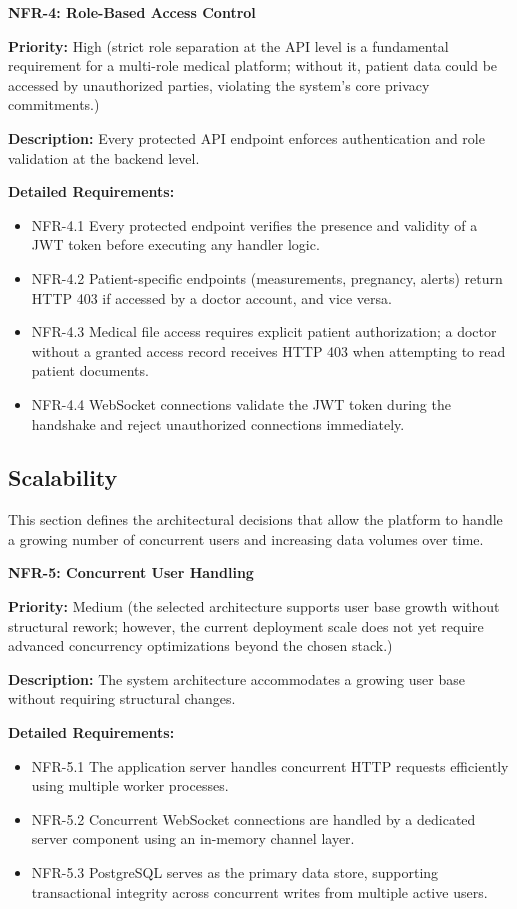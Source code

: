 \medskip

\textbf{NFR-4: Role-Based Access Control}

\textbf{Priority:} High (strict role separation at the API level is a fundamental requirement for a multi-role medical platform; without it, patient data could be accessed by unauthorized parties, violating the system's core privacy commitments.)

\textbf{Description:} Every protected API endpoint enforces authentication and
role validation at the backend level.

\textbf{Detailed Requirements:}
\begin{itemize}
    \item NFR-4.1 \; Every protected endpoint verifies the presence and validity of a
    JWT token before executing any handler logic.
    \item NFR-4.2 \; Patient-specific endpoints (measurements, pregnancy, alerts) return
    HTTP 403 if accessed by a doctor account, and vice versa.
    \item NFR-4.3 \; Medical file access requires explicit patient authorization; a
    doctor without a granted access record receives HTTP 403 when attempting
    to read patient documents.
    \item NFR-4.4 \; WebSocket connections validate the JWT token during the
    handshake and reject unauthorized connections immediately.
\end{itemize}

\subsection{Scalability}

This section defines the architectural decisions that allow the platform to handle
a growing number of concurrent users and increasing data volumes over time.

\textbf{NFR-5: Concurrent User Handling}

\textbf{Priority:} Medium (the selected architecture supports user base growth without structural rework; however, the current deployment scale does not yet require advanced concurrency optimizations beyond the chosen stack.)

\textbf{Description:} The system architecture accommodates a growing user base
without requiring structural changes.

\textbf{Detailed Requirements:}
\begin{itemize}
    \item NFR-5.1 \; The application server handles concurrent HTTP requests efficiently using multiple worker processes.
    \item NFR-5.2 \; Concurrent WebSocket connections are handled by a dedicated server component using an in-memory channel layer.
    \item NFR-5.3 \; PostgreSQL serves as the primary data store, supporting
    transactional integrity across concurrent writes from multiple active users.
\end{itemize}

